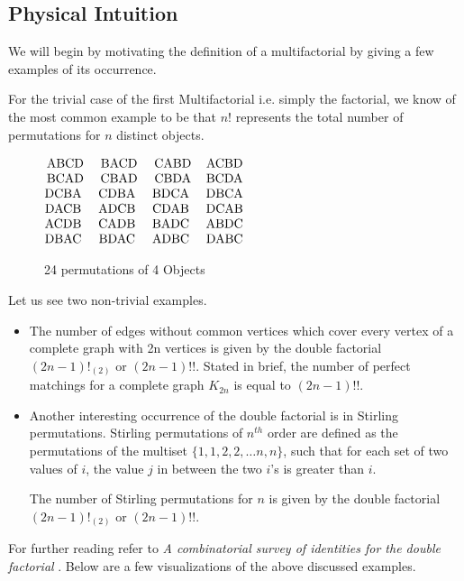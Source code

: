 \documentclass[12pt]{article}
\numberwithin{equation}{section}
\begin{document}
\subsection{Physical Intuition}
We will begin by motivating the definition of a multifactorial by giving a few examples of its occurrence.\par
For the trivial case of the first Multifactorial i.e. simply the factorial, we know of the most common example to be that $n!$ represents the total number of permutations for $n$ distinct objects.
\begin{figure}[htp]
    \centering
    $\begin{matrix}
\textup{ABCD} & \textup{BACD} & \textup{CABD} & \textup{ACBD}\\ 
\textup{BCAD} & \textup{CBAD} & \textup{CBDA} & \textup{BCDA}\\ 
\textup{DCBA }& \textup{CDBA }& \textup{BDCA }& \textup{DBCA}\\ 
\textup{DACB }& \textup{ADCB }& \textup{CDAB }& \textup{DCAB}\\ 
\textup{ACDB }& \textup{CADB }& \textup{BADC }& \textup{ABDC}\\ 
\textup{DBAC }& \textup{BDAC }& \textup{ADBC }& \textup{DABC}
\end{matrix}$
    \caption{24 permutations of 4 Objects}
    \label{fig:permutations}
\end{figure}
\par
Let us see two non-trivial examples.
\begin{itemize}
\item The number of edges without common vertices which cover every vertex of a complete graph with 2n vertices is given by the double factorial $(2n-1)!_{(2)}$ or $(2n-1)!!$. Stated in brief, the number of perfect matchings for a complete graph $K_{2n}$ is equal to $(2n-1)!!$.\par
\item Another interesting occurrence of the double factorial is in Stirling permutations. Stirling permutations of $n^{th}$ order are defined as the permutations of the multiset $\{1, 1, 2, 2, \dots n, n\}$, such that for each set of two values of $i$, the value $j$ in between the two $i$'s is greater than $i$.\par
The number of Stirling permutations for $n$ is given by the double factorial $(2n-1)!_{(2)}$ or $(2n-1)!!$.\par
\end{itemize}
For further reading refer to \textit{A combinatorial survey of identities for the double factorial} \cite{callan2009combinatorial}. Below are a few visualizations of the above discussed examples.
\end{document}
